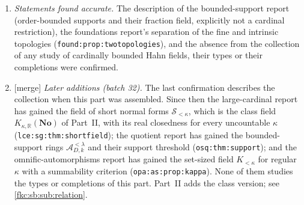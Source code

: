 \documentclass[11pt,letterpaper]{article}
\numberwithin{equation}{section}
\theoremstyle{definition}
\theoremstyle{remark}
\newcommand{\R}{\mathbb R}
\newcommand{\No}{\mathbf{No}}
\newcommand{\mergetag}{\textup{\textsf{\small[merge]}}}%
\newcommand{\KN}[2]{K_{#1,#2}(\No)}%
\begin{document}
\begin{enumerate}[label=\textup{(\arabic*)}]
\item \emph{Statements found accurate.} The description of the bounded-support report (order-bounded supports and their fraction field, explicitly not a cardinal restriction), the foundations report's separation of the fine and intrinsic topologies (\texttt{found:prop:twotopologies}), and the absence from the collection of any study of cardinally bounded Hahn fields, their types or their completions were confirmed.
\item \mergetag{} \emph{Later additions (batch 32).} The last confirmation describes the collection when this part was assembled. Since then the large-cardinal report has gained the field of short normal forms $\mathscr S_{<\kappa}$, which is the class field $\KN\kappa\R$ of Part~II, with its real closedness for every uncountable $\kappa$ (\texttt{lce:sg:thm:shortfield}); the quotient report has gained the bounded-support rings $\mathcal A^{<\lambda}_{D,k}$ and their support threshold (\texttt{osq:thm:support}); and the omnific-automorphisms report has gained the set-sized field $K_{<\kappa}$ for regular $\kappa$ with a summability criterion (\texttt{opa:as:prop:kappa}). None of them studies the types or completions of this part. Part~II adds the class version; see \cref{fkc:sb:sub:relation}.
\end{enumerate}
\end{document}
